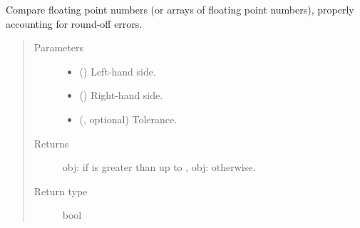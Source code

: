 \documentclass[letterpaper,10pt,english]{sphinxmanual}
\begin{document}

\begin{fulllineitems}
\label{\detokenize{api:utils.greater_than}}
Compare floating point numbers (or arrays of floating point numbers),
properly accounting for round-off errors.
\begin{quote}\begin{description}
\item[{Parameters}] \leavevmode\begin{itemize}
\item {} 
 () \textendash{} Left-hand side.

\item {} 
 () \textendash{} Right-hand side.

\item {} 
 (, optional) \textendash{} Tolerance.

\end{itemize}

\item[{Returns}] \leavevmode
obj: if  is greater than  up to , obj: otherwise.

\item[{Return type}] \leavevmode
bool

\end{description}\end{quote}

\end{fulllineitems}

\end{document}
